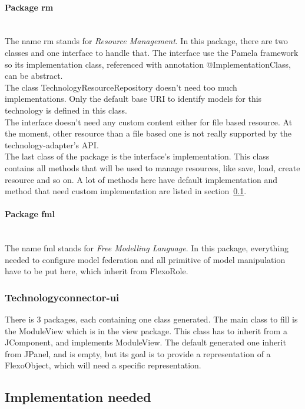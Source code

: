\documentclass[9pt,a4paper]{article}
\begin{document}
		\paragraph{Package rm}~\\
		The name rm stands for \textit{Resource Management}. In this package, there are two classes and one interface to handle that. The interface use the Pamela framework so its implementation class, referenced with annotation @ImplementationClass, can be abstract.\\
		The class TechnologyResourceRepository doesn't need too much implementations. Only the default base URI to identify models for this technology is defined in this class.\\
		The interface doesn't need any custom content either for file based resource. At the moment, other resource than a file based one is not really supported by the technology-adapter's API.\\
		The last class of the package is the interface's implementation. This class contains all methods that will be used to manage resources, like save, load, create resource and so on. A lot of methods here have default implementation and method that need custom implementation are listed in section~\ref{sec:implemToDo}.
		\paragraph{Package fml} ~\\
		The name fml stands for \textit{Free Modelling Language}. In this package, everything needed to configure model federation and all primitive of model manipulation have to be put here, which inherit from FlexoRole.
		
		\subsubsection{Technologyconnector-ui}
		There is 3 packages, each containing one class generated. The main class to fill is the ModuleView which is in the view package. This class has to inherit from a JComponent, and implements ModuleView. The default generated one inherit from JPanel, and is empty, but its goal is to provide a representation of a FlexoObject, which will need a specific representation.
		
	\subsection{Implementation needed}
	\label{sec:implemToDo}
\end{document}
